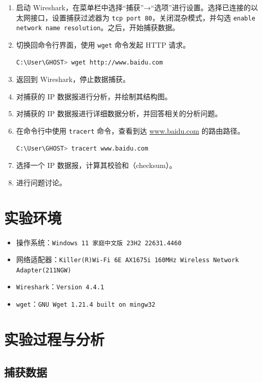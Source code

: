 \documentclass{article}
\begin{document}
	\begin{enumerate}
		\item 启动 Wireshark，在菜单栏中选择“捕获”→“选项”进行设置。选择已连接的以太网接口，设置捕获过滤器为 \texttt{tcp port 80}，关闭混杂模式，并勾选 \texttt{enable network name resolution}。之后，开始捕获数据。
		\item 切换回命令行界面，使用 \texttt{wget} 命令发起 HTTP 请求。
		\begin{lstlisting}[language=bash]
        C:\User\GHOST> wget http://www.baidu.com
		\end{lstlisting}
		\item 返回到 Wireshark，停止数据捕获。
		\item 对捕获的 IP 数据报进行分析，并绘制其结构图。
		\item 对捕获的 IP 数据报进行详细数据分析，并回答相关的分析问题。
		\item 在命令行中使用 \texttt{tracert} 命令，查看到达 \url{www.baidu.com} 的路由路径。
		\begin{lstlisting}[language=bash]
        C:\User\GHOST> tracert www.baidu.com
		\end{lstlisting}
		\item 选择一个 IP 数据报，计算其校验和（checksum）。
		\item 进行问题讨论。
	\end{enumerate}
	
	\section{实验环境}
	
	\begin{itemize}[noitemsep]
		\item 操作系统：\texttt{Windows 11 家庭中文版 23H2 22631.4460}
		\item 网络适配器：\texttt{Killer(R)Wi-Fi 6E AX1675i 160MHz Wireless Network Adapter(211NGW)}
		\item \texttt{Wireshark}：\texttt{Version 4.4.1}
		\item \texttt{wget}：\texttt{GNU Wget 1.21.4 built on mingw32}
	\end{itemize}
	
	\section{实验过程与分析}
	
	\subsection{捕获数据}
	
\end{document}
